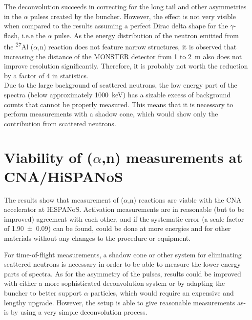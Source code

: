 \documentclass[a4paper,12pt]{report}
\newcommand{\an}{($\alpha$,n) }
\newcommand{\Aliso}{\textsuperscript{27}Al }
\begin{document}
The deconvolution succeeds in correcting for the long tail and other asymmetries in the $\alpha$ pulses created by the buncher.
However, the effect is not very visible when compared to the results assuming a perfect Dirac delta shape for the $\gamma$-flash, i.e.e the $\alpha$ pulse.
As the energy distribution of the neutron emitted from the \Aliso\an reaction does not feature narrow structures, it is observed that increasing the distance of the MONSTER detector from 1 to \qty{2}{\m} also does not improve resolution significantly.
Therefore, it is probably not worth the reduction by a factor of 4 in statistics.
\\

Due to the large background of scattered neutrons, the low energy part of the spectra (below approximately \qty{1000}{\keV}) has a sizable excess of background counts that cannot be properly measured.
This means that it is necessary to perform measurements with a shadow cone, which would show only the contribution from scattered neutrons.

\section{Viability of \an measurements at CNA/HiSPANoS}
The results show that measurement of \an reactions are viable with the CNA accelerator at HiSPANoS.
Activation measurements are in reasonable (but to be improved) agreement with each other, and if the systematic error (a scale factor of \num{1.90(9)}) can be found, could be done at more energies and for other materials without any changes to the procedure or equipment.

For time-of-flight measurements, a shadow cone or other system for eliminating scattered neutrons is necessary in order to be able to measure the lower energy parts of spectra.
As for the asymmetry of the pulses, results could be improved with either a more sophisticated deconvolution system or by adapting the buncher to better support $\alpha$ particles, which would require an expensive and lengthy upgrade.
However, the setup is able to give reasonable measurements as-is by using a very simple deconvolution process.
\end{document}
